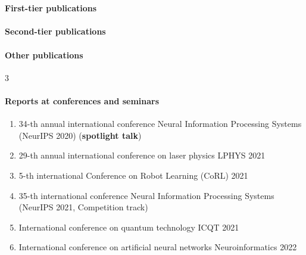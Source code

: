 \section*{}

\paragraph{First-tier publications} 
\begin{refsection} 
    \nocite{confbib1}
    \printbibliography[heading=none]
\end{refsection}

\paragraph{Second-tier publications}
\begin{refsection} 
    \nocite{confbib4}
    \printbibliography[heading=none]
\end{refsection}

\paragraph{Other publications}
\begin{refsection} 
    \nocite{confbib2}
    \nocite{confbib3}
    \nocite{progbib1}
    \printbibliography[heading=none]
\end{refsection}

\expandafter\def\csname blx@maxbibnames\endcsname{3}%

\paragraph{Reports at conferences and seminars}
\begin{enumerate}[labelindent=3pt, labelsep=10pt, topsep=10pt, itemsep=5pt]
    \item 34-th annual international conference Neural Information Processing Systems (NeurIPS 2020) (\textbf{spotlight talk})
    \item 29-th annual international conference on laser physics LPHYS 2021
    \item 5-th international Conference on Robot Learning (CoRL) 2021
    \item 35-th international conference Neural Information Processing Systems (NeurIPS 2021, Competition track)
    \item International conference on quantum technology ICQT 2021
    \item International conference on artificial neural networks Neuroinformatics 2022
\end{enumerate}

